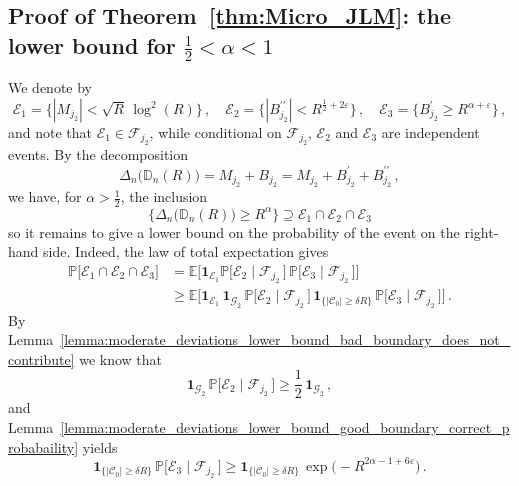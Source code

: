 \documentclass[11pt]{amsart}
\theoremstyle{definition}
\theoremstyle{remark}
\numberwithin{equation}{section}
\def\eps{{\varepsilon}}
\newcommand{\bD}{\mathbb D}
\newcommand{\bP}{\mathbb P}
\newcommand{\bE}{\mathbb E}
\begin{document}
	\subsection{Proof of Theorem~\ref{thm:Micro_JLM}: the lower bound for \texorpdfstring{$\frac{1}{2}<\alpha<1$}{1/2 < alpha < 1}} We denote by
	\begin{equation*}
		\mathcal{E}_1 = \big\{ |M_{j_2}| < \sqrt{R} \, \log^2(R)\big\} \, , \quad  \mathcal{E}_2 = \big\{ |B_{j_2}^{\prime\prime}| < R^{\frac{1}{2} + 2\eps} \big\}\, , \quad  \mathcal{E}_3 = \big\{B_{j_2}^{\prime} \ge R^{\alpha+\eps} \big\} \, , 
	\end{equation*}
	and note that $\mathcal{E}_1 \in \mathcal{F}_{j_2}$, while conditional on $\mathcal{F}_{j_2}$, $\mathcal{E}_2$ and $\mathcal{E}_3$ are independent events.
	By the decomposition
	\[
	\Delta_{n}\big(\bD_n(R)\big) = M_{j_2} + B_{j_2}  = M_{j_2} + B_{j_2}^\prime + B_{j_2}^{\prime\prime} \, ,
	\] 
	we have, for $\alpha>\frac{1}{2}$, the inclusion
	\begin{equation}
		\label{eq:moderate_deviations_lower_bound_inclusion_of_events}
		\Big\{\Delta_{n}\big(\bD_n(R)\big) \ge R^{\alpha} \Big\} \supseteq \mathcal{E}_1\cap \mathcal{E}_2 \cap \mathcal{E}_3 
	\end{equation}
	so it remains to give a lower bound on the probability of the event on the right-hand side. Indeed, the law of total expectation gives
	\begin{align}
		\nonumber \label{eq:moderate_deviations_lower_bound_after_total_expectation}
		\bP\Big[\mathcal{E}_1\cap \mathcal{E}_2 \cap \mathcal{E}_3 \Big] &= \bE\Big[ \mathbf{1}_{\mathcal{E}_1} \bP\big[\mathcal{E}_2 \mid \mathcal{F}_{j_2} \, \big] \, \bP\big[\mathcal{E}_3 \mid \mathcal{F}_{j_2} \, \big]\Big] \\ & \ge \bE\Big[ \mathbf{1}_{\mathcal{E}_1} \, \mathbf{1}_{\mathcal{G}_2} \, \bP\big[\mathcal{E}_2 \mid \mathcal{F}_{j_2} \, \big] \, \mathbf{1}_{\{|\mathcal{C}_0| \ge \delta R\}} \, \bP\big[\mathcal{E}_3 \mid \mathcal{F}_{j_2} \, \big]\Big]\, .
	\end{align}
	By Lemma~\ref{lemma:moderate_deviations_lower_bound_bad_boundary_does_not_contribute} we know that $$\mathbf{1}_{\mathcal{G}_2} \, \bP\big[\mathcal{E}_2 \mid \mathcal{F}_{j_2} \, \big] \ge \frac{1}{2} \, \mathbf{1}_{\mathcal{G}_2}\, ,$$ and Lemma~\ref{lemma:moderate_deviations_lower_bound_good_boundary_correct_probabaility} yields
	\begin{equation*}
		\mathbf{1}_{\{|\mathcal{C}_0| \ge \delta R\}} \, \bP\big[\mathcal{E}_3 \mid \mathcal{F}_{j_2} \, \big] \ge \mathbf{1}_{\{|\mathcal{C}_0| \ge \delta R \}} \, \exp\Big(-R^{2\alpha-1+6\eps}\Big)\, .
	\end{equation*}
\end{document}
